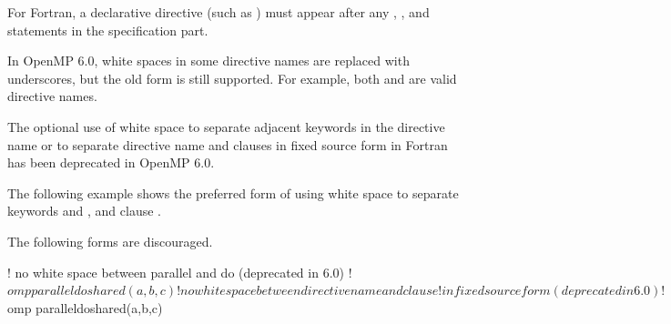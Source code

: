 For Fortran, a declarative directive (such as )
must appear after any , , and  statements
in the specification part.

In OpenMP 6.0, white spaces in some directive names are replaced with
underscores, but the old form is still supported.  For example, 
both  and 
are valid directive names.

\begin{fortranspecific}
The optional use of white space to separate adjacent keywords
in the directive name or to separate directive name and clauses
in fixed source form in Fortran has been deprecated in OpenMP 6.0.

The following example shows the preferred form of using white space
to separate keywords  and , and
clause .

The following forms are discouraged.
\begin{indentedcodelist}
! no white space between parallel and do (deprecated in 6.0)
!$omp paralleldo shared(a,b,c)

! no white space between directive name and clause
!   in fixed source form (deprecated in 6.0)
!$omp paralleldoshared(a,b,c)
\end{indentedcodelist}
\end{fortranspecific}











